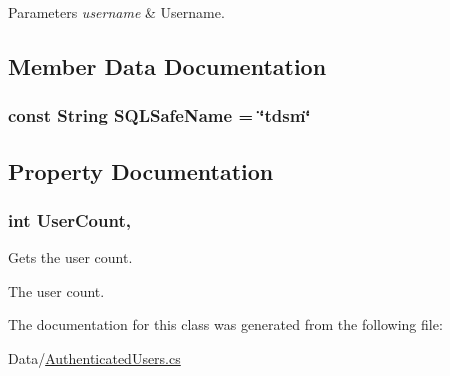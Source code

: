 \begin{DoxyParams}{Parameters}
{\em username} & Username.\\
\hline
\end{DoxyParams}


\subsection{Member Data Documentation}
\hypertarget{classOTA_1_1Data_1_1AuthenticatedUsers_a5f7b801a55ee829062b5878a70c905b4}{}
\subsubsection[{S\+Q\+L\+Safe\+Name}]{\setlength{\rightskip}{0pt plus 5cm}const String S\+Q\+L\+Safe\+Name = \char`\"{}tdsm\char`\"{}}\label{classOTA_1_1Data_1_1AuthenticatedUsers_a5f7b801a55ee829062b5878a70c905b4}


\subsection{Property Documentation}
\hypertarget{classOTA_1_1Data_1_1AuthenticatedUsers_a64d91039c6988ac6df2413447a5caa6b}{}
\subsubsection[{User\+Count}]{\setlength{\rightskip}{0pt plus 5cm}int User\+Count\hspace{0.3cm}{\ttfamily [static]}, {\ttfamily [get]}}\label{classOTA_1_1Data_1_1AuthenticatedUsers_a64d91039c6988ac6df2413447a5caa6b}


Gets the user count. 

The user count.

The documentation for this class was generated from the following file\+:\begin{DoxyCompactItemize}
\item 
Data/\hyperlink{AuthenticatedUsers_8cs}{Authenticated\+Users.\+cs}\end{DoxyCompactItemize}
